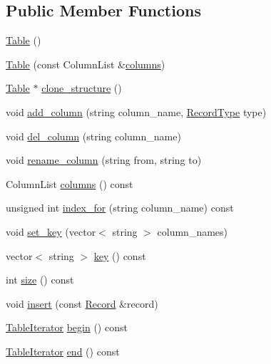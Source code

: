 \subsection*{Public Member Functions}
\begin{DoxyCompactItemize}
\item 
\hyperlink{class_table_a049f2e06391781ae255c6698869c4ad1}{Table} ()
\item 
\hyperlink{class_table_a9d931fcdaa2642148e5bea71dcd824a8}{Table} (const Column\-List \&\hyperlink{class_table_a3185dd0a29eb9fada468a2b42ff9a8a0}{columns})
\item 
\hyperlink{class_table}{Table} $\ast$ \hyperlink{class_table_ae0483f56898b052528eed1ae5391e11d}{clone\-\_\-structure} ()
\item 
void \hyperlink{class_table_a5eda782285dfd05d311de6905dab4e93}{add\-\_\-column} (string column\-\_\-name, \hyperlink{class_table_af8f9ec96ecaa35a2e65312b74ddfeae6}{Record\-Type} type)
\item 
void \hyperlink{class_table_af4c19f81efeece5e7dba4c17d4ee9203}{del\-\_\-column} (string column\-\_\-name)
\item 
void \hyperlink{class_table_ac5c19a55c8527ee267360cd1332317bd}{rename\-\_\-column} (string from, string to)
\item 
Column\-List \hyperlink{class_table_a3185dd0a29eb9fada468a2b42ff9a8a0}{columns} () const 
\item 
unsigned int \hyperlink{class_table_acb9ca5966a6dbae64a4923653031d932}{index\-\_\-for} (string column\-\_\-name) const 
\item 
void \hyperlink{class_table_a38aeaab31fddbd256bc702593a4e8792}{set\-\_\-key} (vector$<$ string $>$ column\-\_\-names)
\item 
vector$<$ string $>$ \hyperlink{class_table_a411f14354a9eb2b85f07fb2187d25271}{key} () const 
\item 
int \hyperlink{class_table_a2c5420361660d9e787487de8d6eb9e44}{size} () const 
\item 
void \hyperlink{class_table_aa1f3a42477818299c83c733e4aa82eb2}{insert} (const \hyperlink{class_record}{Record} \&record)
\item 
\hyperlink{class_table_aa04536c6711fef7696862b4d94c077e9}{Table\-Iterator} \hyperlink{class_table_a020add8ec0eb6fec40695c605adc9038}{begin} () const 
\item 
\hyperlink{class_table_aa04536c6711fef7696862b4d94c077e9}{Table\-Iterator} \hyperlink{class_table_a43c8c8884f3ea7ef66c5de5234e5d93d}{end} () const 
\item 

\end{DoxyCompactItemize}
